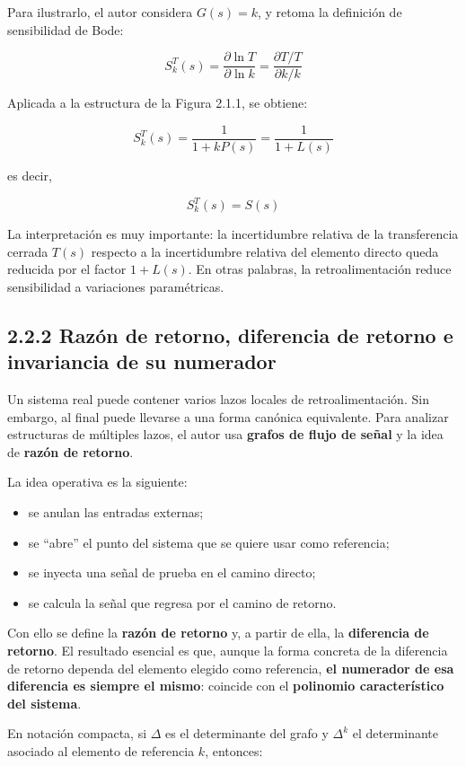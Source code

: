 Para ilustrarlo, el autor considera \(G(s)=k\), y retoma la definición de sensibilidad de Bode:

$$
S_k^T(s)=\frac{\partial \ln T}{\partial \ln k}
=\frac{\partial T/T}{\partial k/k}
$$

Aplicada a la estructura de la Figura 2.1.1, se obtiene:

$$
S_k^T(s)=\frac{1}{1+kP(s)}=\frac{1}{1+L(s)}
$$

es decir,

$$
S_k^T(s)=S(s)
$$

La interpretación es muy importante: la incertidumbre relativa de la transferencia cerrada \(T(s)\) respecto a la incertidumbre relativa del elemento directo queda reducida por el factor \(1+L(s)\). En otras palabras, la retroalimentación reduce sensibilidad a variaciones paramétricas.

\subsection{2.2.2 Razón de retorno, diferencia de retorno e invariancia de su numerador}
Un sistema real puede contener varios lazos locales de retroalimentación. Sin embargo, al final puede llevarse a una forma canónica equivalente. Para analizar estructuras de múltiples lazos, el autor usa \textbf{grafos de flujo de señal} y la idea de \textbf{razón de retorno}.

La idea operativa es la siguiente:

\begin{itemize}
  \item se anulan las entradas externas;
  \item se “abre” el punto del sistema que se quiere usar como referencia;
  \item se inyecta una señal de prueba en el camino directo;
  \item se calcula la señal que regresa por el camino de retorno.
\end{itemize}

Con ello se define la \textbf{razón de retorno} y, a partir de ella, la \textbf{diferencia de retorno}. El resultado esencial es que, aunque la forma concreta de la diferencia de retorno dependa del elemento elegido como referencia, \textbf{el numerador de esa diferencia es siempre el mismo}: coincide con el \textbf{polinomio característico del sistema}.

En notación compacta, si \(\Delta\) es el determinante del grafo y \(\Delta^k\) el determinante asociado al elemento de referencia \(k\), entonces:

